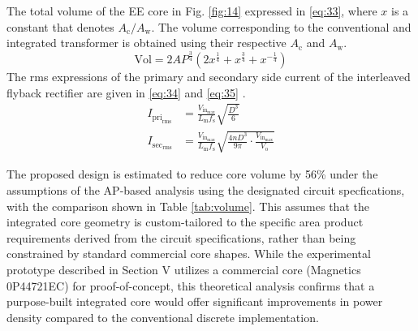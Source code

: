 \documentclass[lettersize,journal]{IEEEtran}
\begin{document}
The total volume of the EE core in Fig. \ref{fig:14} expressed in \eqref{eq:33}, where $x$ is a constant that denotes $A_{\mathrm{c}}/A_{\mathrm{w}}$. The volume corresponding to the conventional and integrated transformer is obtained using their respective $A_{\mathrm{c}}$ and $A_{\mathrm{w}}$.
\begin{equation}
\label{eq:33}
\mathrm{Vol} = 2 AP^{\frac{3}{4}} (2 x^{\frac{1}{4}} + x^{\frac{3}{4}} + x^{-\frac{1}{4}})
\end{equation}
The rms expressions of the primary and secondary side current of the interleaved flyback rectifier are given in \eqref{eq:34} and \eqref{eq:35} \cite{ref8}.
\begin{align}
I_{\mathrm{pri}_{\mathrm{rms}}} &= \frac{V_{\mathrm{in}_{\mathrm{max}}}}{L_{\mathrm{m}} f_{\mathrm{s}}} \sqrt{\frac{D^3}{6}} \label{eq:34}\\
I_{\mathrm{sec}_{\mathrm{rms}}} &= \frac{V_{\mathrm{in}_{\mathrm{max}}}}{L_{\mathrm{m}} f_{\mathrm{s}}} \sqrt{\frac{4 n D^3}{9 \pi} \cdot \frac{V_{\mathrm{in}_{\mathrm{max}}}}{V_{\mathrm{o}}}} \label{eq:35}
\end{align}

The proposed design is estimated to reduce core volume by 56\% under the assumptions of the AP-based analysis using the designated circuit specfications, with the comparison shown in Table \ref{tab:volume}. This assumes that the integrated core geometry is custom-tailored to the specific area product requirements derived from the circuit specifications, rather than being constrained by standard commercial core shapes. While the experimental prototype described in Section V utilizes a commercial core (Magnetics 0P44721EC) for proof-of-concept, this theoretical analysis confirms that a purpose-built integrated core would offer significant improvements in power density compared to the conventional discrete implementation.
\end{document}
